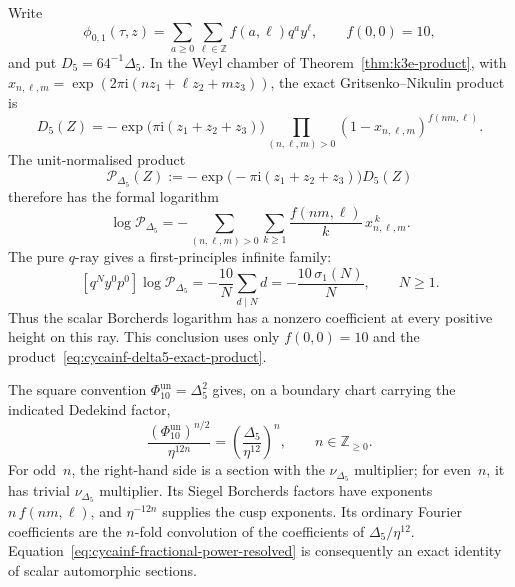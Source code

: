 \begin{remark}
\label{rem:cycainf-nonclosure-imag-cone}
Write
\[
 \phi_{0,1}(\tau,z)
 =\sum_{a\geq0}\sum_{\ell\in\mathbb Z}f(a,\ell)q^a y^\ell,
 \qquad f(0,0)=10,
\]
and put $D_5=64^{-1}\Delta_5$.  In the Weyl chamber of
Theorem~\ref{thm:k3e-product}, with
$x_{n,\ell,m}=\exp(2\pi\mathrm i(nz_1+\ell z_2+mz_3))$, the exact
Gritsenko--Nikulin product is
\begin{equation}
\label{eq:cycainf-delta5-exact-product}
 D_5(Z)
 =-\exp\!\bigl(\pi\mathrm i(z_1+z_2+z_3)\bigr)
 \prod_{(n,\ell,m)>0}
 (1-x_{n,\ell,m})^{f(nm,\ell)}.
\end{equation}
The unit-normalised product
\[
 \mathscr P_{\Delta_5}(Z)
 :=-\exp\!\bigl(-\pi\mathrm i(z_1+z_2+z_3)\bigr)D_5(Z)
\]
therefore has the formal logarithm
\begin{equation}
\label{eq:cycainf-delta5-formal-log}
 \log\mathscr P_{\Delta_5}
 =
 -\sum_{(n,\ell,m)>0}\sum_{k\geq1}
 \frac{f(nm,\ell)}{k}\,x_{n,\ell,m}^{\,k}.
\end{equation}
The pure $q$-ray gives a first-principles infinite family:
\begin{equation}
\label{eq:cycainf-delta5-pure-q-ray}
 [q^N y^0p^0]\log\mathscr P_{\Delta_5}
 =-\frac{10}{N}\sum_{d\mid N}d
 =-\frac{10\,\sigma_1(N)}{N},
 \qquad N\geq1.
\end{equation}
Thus the scalar Borcherds logarithm has a nonzero coefficient at every
positive height on this ray.  This conclusion uses only
$f(0,0)=10$ and the product~\eqref{eq:cycainf-delta5-exact-product}.

The square convention
$\Phi_{10}^{\mathrm{un}}=\Delta_5^2$ gives, on a boundary chart carrying
the indicated Dedekind factor,
\begin{equation}
\label{eq:cycainf-fractional-power-resolved}
 \frac{(\Phi_{10}^{\mathrm{un}})^{n/2}}{\eta^{12n}}
 =
 \left(\frac{\Delta_5}{\eta^{12}}\right)^{\!n},
 \qquad n\in\mathbb Z_{\geq0}.
\end{equation}
For odd~$n$, the right-hand side is a section with the
$\nu_{\Delta_5}$ multiplier; for even~$n$, it has trivial
$\nu_{\Delta_5}$ multiplier.  Its Siegel Borcherds factors have
exponents $n\,f(nm,\ell)$, and $\eta^{-12n}$ supplies the cusp
exponents.  Its ordinary Fourier coefficients are the
$n$-fold convolution of the coefficients of
$\Delta_5/\eta^{12}$.  Equation~\eqref{eq:cycainf-fractional-power-resolved}
is consequently an exact identity of scalar automorphic sections.


\end{remark}
